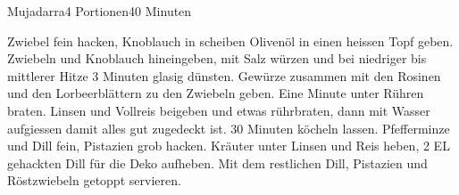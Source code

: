 \begin{recipe}{Mujadarra}{4 Portionen}{40 Minuten}

Zwiebel fein hacken, Knoblauch in scheiben
Olivenöl in einen heissen Topf geben. Zwiebeln und Knoblauch hineingeben, mit Salz würzen und bei niedriger bis mittlerer Hitze 3 Minuten glasig dünsten.
Gewürze zusammen mit den Rosinen und den Lorbeerblättern zu den Zwiebeln geben. Eine Minute unter Rühren braten.
Linsen und Vollreis beigeben und etwas rührbraten, dann mit Wasser aufgiessen damit alles gut zugedeckt ist. 30 Minuten köcheln lassen.
Pfefferminze und Dill fein, Pistazien grob hacken. Kräuter unter Linsen und Reis heben, 2 EL gehackten Dill für die Deko aufheben.
Mit dem restlichen Dill, Pistazien und Röstzwiebeln getoppt servieren.

\end{recipe}
